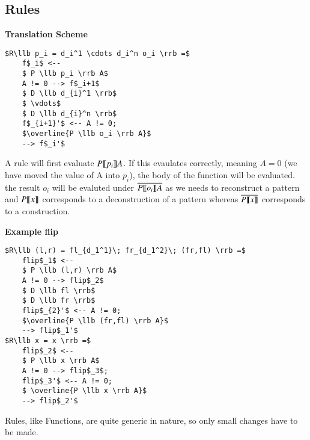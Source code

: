 \documentclass[a4paper]{article}
\begin{document}
\subsection{Rules}
\label{sec:org4a8c751}
\begin{minipage}[t]{0.6\textwidth}
\textbf{Translation Scheme}
\begin{lstlisting}
$R\llb p_i = d_i^1 \cdots d_i^n o_i \rrb =$
    f$_i$ <--
    $ P \llb p_i \rrb A$
    A != 0 --> f$_i+1$
    $ D \llb d_{i}^1 \rrb$
    $ \vdots$
    $ D \llb d_{i}^n \rrb$
    f$_{i+1}'$ <-- A != 0;
    $\overline{P \llb o_i \rrb A}$
    --> f$_i'$
\end{lstlisting}
A rule will first evaluate \(P \llbracket p_i \rrbracket A\). If this evaulates correctly, meaning \(A = 0\) (we have moved the value of A into \(p_i\)), the body of the function will be evaluated. the result \(o_i\) will be evaluted under \(\overline{P \llbracket o_i \rrbracket A}\) as we needs to reconstruct a pattern and \(P \llbracket x \rrbracket\) corresponds to a deconstruction of a pattern whereas \(\overline{ P \llbracket x \rrbracket }\) corresponds to a construction.
\end{minipage}
\qquad
\begin{minipage}[t]{0.4\textwidth}
\textbf{Example flip}
\begin{lstlisting}
$R\llb (l,r) = fl_{d_1^1}\; fr_{d_1^2}\; (fr,fl) \rrb =$
    flip$_1$ <--
    $ P \llb (l,r) \rrb A$
    A != 0 --> flip$_2$
    $ D \llb fl \rrb$
    $ D \llb fr \rrb$
    flip$_{2}'$ <-- A != 0;
    $\overline{P \llb (fr,fl) \rrb A}$
    --> flip$_1'$
$R\llb x = x \rrb =$
    flip$_2$ <--
    $ P \llb x \rrb A$
    A != 0 --> flip$_3$;
    flip$_3'$ <-- A != 0;
    $ \overline{P \llb x \rrb A}$
    --> flip$_2'$
\end{lstlisting}
Rules, like Functions, are quite generic in nature, so only small changes have to be made.
\end{minipage}
\end{document}
